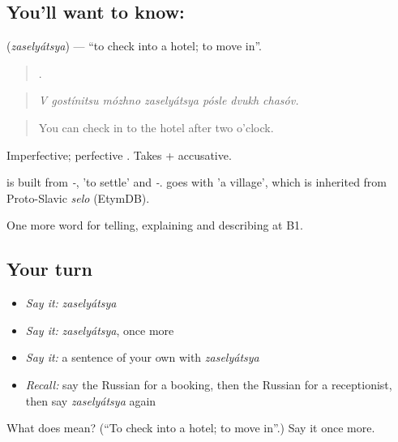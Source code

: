\subsection*{You'll want to know: }
\textbf{} (\emph{zaselyátsya}) — \textquotedblleft{}to check into a hotel; to move in\textquotedblright{}.

\begin{quote}
      .
\end{quote}

\begin{quote}
\emph{V gostínitsu mózhno zaselyátsya pósle dvukh chasóv.}
\end{quote}

\begin{quote}
You can check in to the hotel after two o'clock.
\end{quote}

Imperfective; perfective \emph{}. Takes \emph{} + accusative.

\begin{cousinweb}
\emph{} is built from \emph{-}, \emph{} 'to settle' and \emph{-}. \emph{} goes with \emph{} 'a village', which is inherited from Proto-Slavic \emph{selo} (EtymDB).
\end{cousinweb}

\begin{grammarlens}[title={What you've built}]
One more word for telling, explaining and describing at B1.
\end{grammarlens}

\subsection*{Your turn}
\begin{itemize}
\raggedright
  \item \emph{Say it:} \emph{zaselyátsya}
  \item \emph{Say it:} \emph{zaselyátsya}, once more
  \item \emph{Say it:} a sentence of your own with \emph{zaselyátsya}
  \item \emph{Recall:} say the Russian for a booking, then the Russian for a receptionist, then say \emph{zaselyátsya} again
\end{itemize}

\begin{tcolorbox}[breakable,colback=teal!4,colframe=teal!35!black,title={Before you move on}]
What does  mean? (\textquotedblleft{}To check into a hotel; to move in\textquotedblright{}.) Say it once more.
\end{tcolorbox}

